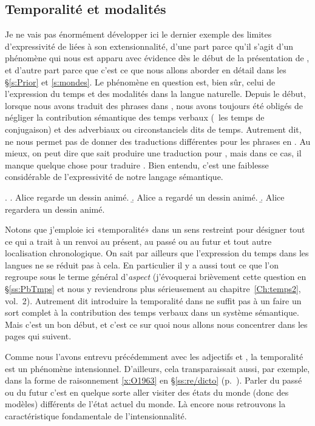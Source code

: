 \subsection{Temporalité et modalités}
\label{ss:tempomod}

Je ne vais pas énormément développer ici le dernier exemple des limites d'expressivité de {\LO} liées à son extensionnalité, d'une part parce qu'il s'agit d'un phénomène qui nous est apparu avec évidence dès le début de la présentation de {\LO}, et d'autre part parce que c'est ce que nous allons aborder en détail dans les \S\ref{s:Prior} et \ref{s:mondes}.  Le phénomène en question est, bien sûr, celui de l'expression du temps et des modalités dans la langue naturelle. Depuis le début, lorsque nous avons traduit des phrases dans {\LO}, nous avons toujours été obligés de négliger la contribution sémantique des temps verbaux (\ie\ les temps de conjugaison) et des adverbiaux ou circonstanciels dits de temps. 
Autrement dit, {\LO} ne nous permet pas de donner des traductions différentes pour les phrases en \Next. Au mieux, on peut dire que {\LO} sait produire une traduction pour \Next[a], mais dans ce cas, il manque quelque chose pour traduire \Next[b,c].  Bien entendu, c'est une faiblesse considérable de l'expressivité de notre langage sémantique.

\ex.
\a. Alice regarde un dessin animé.
\b. Alice a regardé un dessin animé.
\b. Alice regardera un dessin animé.




Notons que j'emploie ici «temporalité»  dans un sens restreint pour désigner tout ce qui a trait à un renvoi au présent, au passé ou au futur et tout autre localisation chronologique. On sait par ailleurs que l'expression du temps dans les langues ne se réduit pas à cela. En particulier il y a aussi tout ce que l'on regroupe sous le terme général d'\emph{aspect} (j'évoquerai brièvement cette question en \S\ref{ss:PbTmps} et nous y reviendrons plus sérieusement au chapitre~\ref{Ch:temps2}, vol.~2). Autrement dit introduire la temporalité dans {\LO} ne suffit pas à un faire un sort complet à la contribution des temps verbaux dans un système sémantique.  Mais c'est un bon début, et c'est ce sur quoi nous allons nous concentrer dans les pages qui suivent.%
\label{TpsvsAsp} 

\sloppy
Comme nous l'avons entrevu précédemment avec les adjectifs   et , la temporalité est un phénomène intensionnel. D'ailleurs, cela transparaissait aussi, par exemple, dans la forme de raisonnement \ref{x:O1963} en \S\ref{ss:re/dicto} (p.~\pageref{x:O1963}).  Parler du passé ou du futur c'est en quelque sorte aller visiter des états du monde (donc des modèles) différents de l'état actuel du monde.  Là encore nous retrouvons la caractéristique fondamentale de l'intensionnalité.

